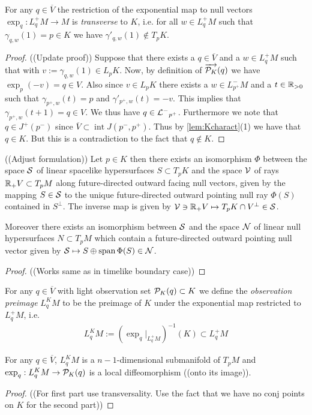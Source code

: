 \begin{lemma}\label{prop:transversality}
For any $q\in \overline{V}$ the restriction of the exponential map to null vectors $\exp_q:L^+_qM\to M$ is \emph{transverse} to $K$, i.e. for all $w\in L^+_qM$ such that $\gamma_{q,w}(1) = p\in K$ we have $\gamma'_{q,w}(1)\notin T_pK$.
\end{lemma}
\begin{proof}((Update proof))
Suppose that there exists a $q\in \overline{V}$ and a $w\in L^+_qM$ such that with $v:=\gamma_{q,w}(1)\in L_pK$. Now, by definition of $\overrightarrow{\mathcal{P}_K}(q)$ we have $\exp_p(-v) = q\in V$. Also since $v\in L_pK$ there exists a $w\in L^-_{p^+}M$ and a $t\in \mathbb{R}_{>0}$ such that $\gamma_{p^+,w}(t) = p$ and $\gamma'_{p^+,w}(t) = -v$. This implies that $\gamma_{p^+,w}(t+1) = q \in V$. We thus have $q \in \mathcal{L^-}_{p^+}$. Furthermore we note that $q\in J^+(p^-)$ since $\overline{V}\subset \operatorname{int}J(p^-,p^+)$.
Thus by \ref{lem:Kcharact}(1) we have that $q\in K$. But this is a contradiction to the fact that $q\notin K$.
\end{proof}


\begin{lemma}\label{lem:dirreconstr}
((Adjust formulation))
Let $p\in K$ then there exists an isomorphism $\Phi$ between the space $\mathcal{S}$ of linear spacelike hypersurfaces $S\subset T_pK$ and the space $\mathcal{V}$ of rays $\mathbb{R}_+V\subset T_pM$ along future-directed outward facing null vectors, given by the mapping $S\in \mathcal{S}$ to the unique future-directed outward pointing null ray $\Phi(S)$ contained in $S^\perp$. The inverse map is given by $\mathcal{V}\ni \mathbb{R}_+V \mapsto T_pK \cap V^\perp\in \mathcal{S}$.

Moreover there exists an isomorphism between $\mathcal{S}$ and the space $\mathcal{N}$ of linear null hypersurfaces $N\subset T_pM$ which contain a future-directed outward pointing null vector given by $\mathcal{S}\mapsto S\oplus \operatorname{span} \Phi(S)\in \mathcal{N}$.
\end{lemma}
\begin{proof}
((Works same as in timelike boundary case))
\end{proof}

\begin{definition}
For any $q\in \overline{V}$ with light observation set $\mathcal{P}_K(q)\subset K$ we define the \emph{observation preimage} $L^K_qM$ to be the preimage of $K$ under the exponential map restricted to $L^+_qM$, i.e. 
\begin{align*}
    L^K_qM := (\exp_q\rvert_{L^+_qM})^{-1}(K) \subset L^+_qM
\end{align*}
\end{definition}
\begin{lemma}\label{lem:preimage}
For any $q\in \overline{V}$, $L^K_qM$ is a $n-1$-dimensional submanifold of $T_pM$ and $\exp_q:L^K_qM\to \mathcal{P}_K(q)$ is a local diffeomorphism ((onto its image)).
\end{lemma}
\begin{proof}
((For first part use transversality. Use the fact that we have no conj points on $K$ for the second part))
\end{proof}



